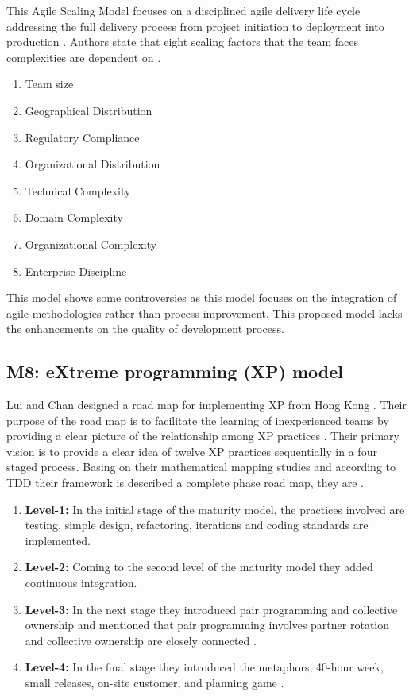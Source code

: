 \documentclass[a4paper,oneside]{bth}
\begin{document}
This Agile Scaling Model focuses on a disciplined agile delivery life cycle addressing the full delivery process from project initiation to deployment into production \cite{ambler_agile_2009}. Authors state that eight scaling factors that the team faces complexities are dependent on \cite{ambler_agile_2009}.
\begin{enumerate}
\item Team size
\item Geographical Distribution
\item Regulatory Compliance
\item Organizational Distribution
\item Technical Complexity
\item Domain Complexity
\item Organizational Complexity
\item Enterprise Discipline
\end{enumerate}
This model shows some controversies as this model focuses on the integration of agile methodologies rather than process improvement. This proposed model lacks the enhancements on the quality of development process.
\subsection{M8: eXtreme programming (XP) model }
Lui and Chan designed a road map for implementing XP from Hong Kong \cite{lui_road_2005}. Their purpose of the road map is to facilitate the learning of inexperienced teams by providing a clear picture of the relationship among XP practices  \cite{lui_road_2005}. Their primary vision is to provide a clear idea of twelve XP practices sequentially in a four staged process. Basing on their mathematical mapping studies and according to TDD their framework is described a complete phase road map, they are  \cite{lui_road_2005}.
\begin{enumerate}
\item \textbf{Level-1:} In the initial stage of the maturity model, the practices involved are testing, simple design, refactoring, iterations and coding standards are implemented.
\item	\textbf{Level-2:} Coming to the second level of the maturity model they added continuous integration.
\item	\textbf{Level-3:} In the next stage they introduced pair programming and collective ownership and mentioned that pair programming involves partner rotation and collective ownership are closely connected  \cite{lui_road_2005}.
\item \textbf{Level-4:} In the final stage they introduced the metaphors, 40-hour week, small releases, on-site customer, and planning game  \cite{lui_road_2005}.

\end{enumerate}
\end{document}
